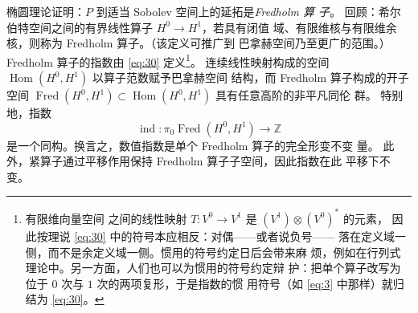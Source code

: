 \documentclass[11pt]{amsart}
\theoremstyle{definition}
\theoremstyle{remark}
\theoremstyle{plain}
\numberwithin{equation}{section}
\renewcommand{\:}{\colon}
\DeclareMathOperator{\Hom}{Hom}
\newcommand{\ZZ}{{\mathbb Z}}
\DeclareMathOperator{\coker}{coker}
\DeclareMathOperator{\ind}{ind}
\DeclareMathOperator{\Fred}{Fred}
\begin{document}
椭圆理论证明：$P$ 到适当 Sobolev 空间上的延拓是\emph{Fredholm 算
子}。
回顾：希尔伯特空间之间的有界线性算子 $H^0\to H^1$，若具有闭值
域、有限维核与有限维余核，则称为 Fredholm 算子。（该定义可推广到
巴拿赫空间乃至更广的范围。）
Fredholm 算子的指数由 \eqref{eq:30} 定义\footnote{有限维向量空间
之间的线性映射 $T\:V^0\to V^1$ 是 $(V^1)\otimes (V^0)^*$ 的元素，
因此按理说 \eqref{eq:30} 中的符号本应相反：对偶——或者说负号——
落在定义域一侧，而不是余定义域一侧。惯用的符号约定日后会带来麻
烦，例如在行列式理论中。另一方面，人们也可以为惯用的符号约定辩
护：把单个算子改写为位于 $0$ 次与 $1$ 次的两项复形，于是指数的惯
用符号（如 \eqref{eq:3} 中那样）就归结为 \eqref{eq:30}。}。
连续线性映射构成的空间 $\Hom(H^0,H^1)$ 以算子范数赋予巴拿赫空间
结构，而 Fredholm 算子构成的开子空间
$\Fred(H^0,H^1)\subset \Hom(H^0,H^1)$ 具有任意高阶的非平凡同伦
群。
特别地，指数
  \begin{equation}\label{eq:34}
     \ind \:\pi _0\Fred(H^0,H^1)\longrightarrow \ZZ
  \end{equation}
是一个同构。换言之，数值指数是单个 Fredholm 算子的完全形变不变
量。
此外，紧算子通过平移作用保持 Fredholm 算子子空间，因此指数在此
平移下不变。
\end{document}
